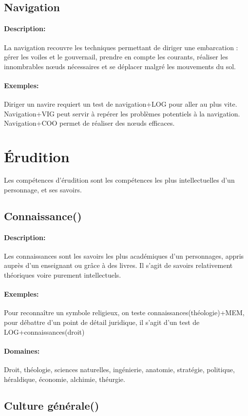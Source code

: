 \documentclass[10pt,a4paper,twocolumn]{book}
\begin{document}
\subsection{Navigation}
\paragraph{Description:}La navigation recouvre les techniques permettant de diriger une embarcation : gérer les voiles et le gouvernail, prendre en compte les courants, réaliser les innombrables nœuds nécessaires et se déplacer malgré les mouvements du sol.
\paragraph{Exemples:}Diriger un navire requiert un test de navigation+LOG pour aller au plus vite. Navigation+VIG peut servir à repérer les problèmes potentiels à la navigation. Navigation+COO permet de réaliser des nœuds efficaces.

\section{Érudition}
Les compétences d'érudition sont les compétences les plus intellectuelles d'un personnage, et ses savoirs.
\subsection{Connaissance()}
\paragraph{Description:}Les connaissances sont les savoirs les plus académiques d'un personnages, appris auprès d'un enseignant ou grâce à des livres. Il s'agit de savoirs relativement théoriques voire purement intellectuels.
\paragraph{Exemples:}Pour reconnaître un symbole religieux, on teste connaissances(théologie)+MEM, pour débattre d'un point de détail juridique, il s'agit d'un test de LOG+connaissances(droit)
\paragraph{Domaines:}Droit, théologie, sciences naturelles, ingénierie, anatomie, stratégie, politique, héraldique, économie, alchimie, théurgie.
\subsection{Culture générale()}
\end{document}
